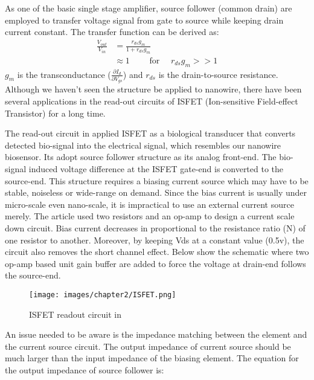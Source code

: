 As one of the basic single stage amplifier, source follower (common drain) are employed to transfer voltage signal from gate to source while keeping drain current constant.
The transfer function can be derived as:
\setlength{\mathindent}{5.5cm}
\begin{align}
    \frac{V_{out}}{V_{in}} & = \frac{r_{ds}g_m}{1 + r_{ds}g_m} \\    \label{eq:sfTF}
                           & \approx 1 \qquad \text{ for } \quad r_{ds}g_m >> 1
\end{align}
$g_m$ is the transconductance ($\frac{\partial I_d}{\partial V_{gs}}$) and $r_{ds}$ is the drain-to-source resistance.
Although we haven't seen the structure be applied to nanowire, there have been several applications in the read-out circuits of ISFET (Ion-sensitive Field-effect Transistor)\cite{SF1, SF2} for a long time.



The read-out circuit in \cite{SF1} applied ISFET as a biological transducer that converts detected bio-signal into the electrical signal, which resembles our nanowire biosensor.
Its adopt source follower structure as its  analog front-end.
The bio-signal induced voltage difference at the ISFET gate-end is converted to the source-end.
This structure requires a biasing current source which may have to be stable, noiseless or wide-range on demand.
Since the bias current is usually under micro-scale even nano-scale, it is impractical to use an external current source merely.
The article used two resistors and an op-amp to design a current scale down circuit.
Bias current decreases in proportional to the resistance ratio (N) of one resistor to another.
Moreover, by keeping Vds at a constant value (0.5v), the circuit also removes the short channel effect.
Below show the schematic where two op-amp based unit gain buffer are added to force the voltage at drain-end follows the source-end.

\begin{figure}[h]
    \centering
    \texttt{[image: images/chapter2/ISFET.png]}
    \fontsize{6}{7}\selectfont
    \caption{ISFET readout circuit in \cite{SF1}}
    \label{fig:ISFET}
\end{figure}

An issue needed to be aware is the impedance matching between the element and the current source circuit.
The output impedance of current source should be much larger than the input impedance of the biasing element.
The equation for the output impedance of source follower is:

